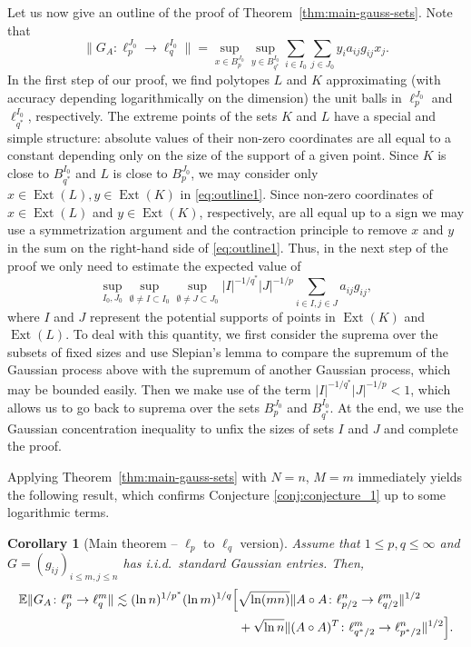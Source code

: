 \documentclass[a4paper]{amsart}
\newtheorem{corollary}[theorem]{Corollary} %
\theoremstyle{definition}
\theoremstyle{remark}
\numberwithin{equation}{section}
\newcommand*{\EE}{\mathbb{E}}
\newcommand*{\hadprod}{\mathbin{\circ}} %
\newcommand*{\Ext}{\operatorname{Ext}} %
\begin{document}
Let us now give an outline of the proof of  Theorem~\ref{thm:main-gauss-sets}. Note that
\begin{equation} \label{eq:outline1}
	 \|G_A\colon \ell_p^{J_0} \to \ell_q^{I_0} \| =  \sup_{x\in B_p^ {J_0}} \sup_{y\in B_{q^\ast}^ {I_0}} \sum_{i\in I_0} \sum_{j\in J_0} y_i a_{ij}g_{ij}x_j.
\end{equation}
In the first step of our proof, we find  polytopes $L$ and $K$ approximating (with accuracy depending logarithmically on the dimension) the unit balls in $\ell_p^{J_0}$ and $\ell_{q^\ast}^{I_0}$, respectively.
The extreme points of the sets $K$ and $L$ have a special and simple structure: absolute values of their non-zero coordinates are all equal to a constant depending only on the size of the support of a given point.
Since $K$ is close to
$B_{q^*}^{I_0}$
and $L$ is close
to $B_p^{J_0}$, we may consider only $x\in \Ext (L), y\in \Ext (K)$ in \eqref{eq:outline1}.
 Since non-zero coordinates of $x\in \Ext (L)$ and $y\in \Ext (K)$, respectively, are all equal up to a sign we may use a symmetrization argument and the contraction principle to
 remove
 $x$ and $y$ in the sum on the right-hand side of  \eqref{eq:outline1}.
  Thus, in the next step of the proof we only need to estimate the expected value of
 \[
 	 \sup_{I_0, J_0} \sup_{\emptyset\neq I\subset I_0}\sup_{\emptyset\neq J\subset J_0} |I|^{-1/q^*}|J|^{-1/p} \sum_{i\in I, j\in J} a_{ij}g_{ij},
 \]
where $I$ and $J$ represent the potential supports of points in $\Ext (K)$ and $\Ext (L)$.
To deal with this quantity, we first consider the suprema over the subsets of fixed sizes and use Slepian's lemma to compare the supremum of the Gaussian process above with the supremum of another Gaussian process, which may be  bounded easily.
Then we make use of the term $|I|^{-1/q^*}|J|^{-1/p}<1$, which allows us to go back to suprema over the sets $B_p^ {J_0}$ and $B_{q^*}^ {I_0}$.
At the end, we use the Gaussian concentration inequality to unfix the sizes of sets $I$ and $J$ and complete the proof.


Applying  Theorem~\ref{thm:main-gauss-sets} with $N=n$, $M=m$ immediately yields the following result, which confirms Conjecture \ref{conj:conjecture_1}
up to some logarithmic terms.

\begin{corollary}[Main theorem -- $\ell_p$ to $\ell_q$ version]
\label{cor:main-gauss}
	Assume that $1\leq p,q \leq \infty$ and $G=(g_{ij})_{i\leq m, j\leq n}$ has i.i.d.\ standard Gaussian entries. Then,
 \begin{align*}
 \EE \|G_A \colon \ell^n_p\to \ell^m_q\|
 \lesssim  (\ln n)^{1/p^*}  (\ln m)^{1/q} \Bigl[ & \sqrt{\ln(mn)} \|A\hadprod A \colon \ell^n_{p/2} \to \ell^m_{q/2}\|^{1/2}\\
& +\sqrt{\ln n}  \|(A\hadprod A)^T \colon \ell^m_{q^*/2} \to \ell^n_{p^*/2}\|^{1/2} \Bigr].
 \end{align*}
\end{corollary}
\end{document}
